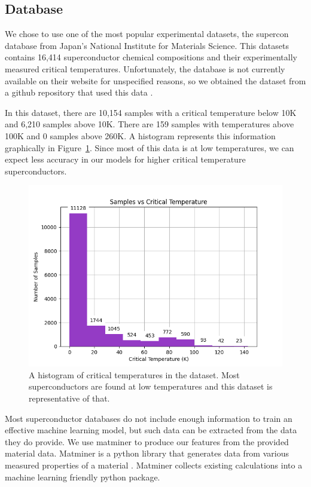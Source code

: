 \documentclass[twocolumn, nofootinbib, secnumarabic, amssymb, nobibnotes, aps, prd]{revtex4-2}
\begin{document}
\subsection{Database}
We chose to use one of the most popular experimental datasets, the supercon database from Japan's National Institute for Materials Science. This datasets contains 16,414 superconductor chemical compositions and their experimentally measured critical temperatures. Unfortunately, the database is not currently available on their website for unspecified reasons, so we obtained the dataset from a github repository that used this data \cite{vstanev1_2018}. 

In this dataset, there are 10,154 samples with a critical temperature below 10K and 6,210 samples above 10K. There are 159 samples with temperatures above 100K and 0 samples above 260K. A histogram represents this information graphically in Figure~\ref{fig:data-histogram}. Since most of this data is at low temperatures, we can expect less accuracy in our models for higher critical temperature superconductors.

 \begin{figure}[!htb]
    \centering %
    \includegraphics[width=\columnwidth]{images/dataset_histogram.png}
    \caption{A histogram of critical temperatures in the dataset. Most superconductors are found at low temperatures and this dataset is representative of that.} %
    \label{fig:data-histogram}
 \end{figure}

Most superconductor databases do not include enough information to train an effective machine learning model, but such data can be extracted from the data they do provide. We use matminer to produce our features from the provided material data. Matminer is a python library that generates data from various measured properties of a material \cite{WARD201860}. Matminer collects existing calculations into a machine learning friendly python package. %
\end{document}
